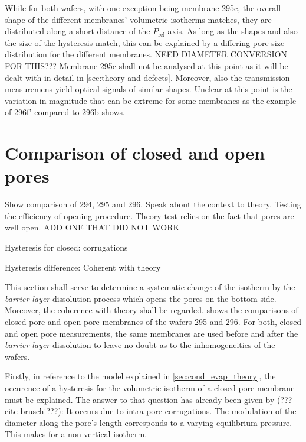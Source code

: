 \documentclass[../thesis.tex]{subfiles}
\begin{document}
        While for both wafers, with one exception being membrane 295c, the overall shape of the different membranes' volumetric isotherms matches, they are distributed along a short distance of the $P_\mathrm{rel}$-axis. As long as the shapes and also the size of the hysteresis match, this can be explained by a differing pore size distribution for the different membranes. NEED DIAMETER CONVERSION FOR THIS??? Membrane 295c shall not be analysed at this point as it will be dealt with in detail in \cref{sec:theory-and-defects}. Moreover, also the transmission measuremens yield optical signals of similar shapes. Unclear at this point is the variation in magnitude that can be extreme for some membranes as the example of 296f' compared to 296b shows.

        

        


      \section{Comparison of closed and open pores}
      \label{sec:comparison-cp-op}

        Show comparison of 294, 295 and 296. Speak about the context to theory. Testing the efficiency of opening procedure. Theory test relies on the fact that pores are well open. ADD ONE THAT DID NOT WORK

        Hysteresis for closed: corrugations

        Hysteresis difference: Coherent with theory
        \medskip

        This section shall serve to determine a systematic change of the isotherm by the \textit{barrier layer} dissolution process which opens the pores on the bottom side. Moreover, the coherence with theory shall be regarded.  shows the comparisons of closed pore and open pore membranes of the wafers 295 and 296. For both, closed and open pore measurements, the same membranes are used before and after the \textit{barrier layer} dissolution to leave no doubt as to the inhomogeneities of the wafers.

        

        Firstly, in reference to the model explained in \cref{sec:cond_evap_theory}, the occurence of a hysteresis for the volumetric isotherm of a closed pore membrane must be explained. The answer to that question has already been given by (???cite bruschi???): It occurs due to intra pore corrugations. The modulation of the diameter along the pore's length corresponds to a varying equilibrium pressure. This makes for a non vertical isotherm.
\end{document}
